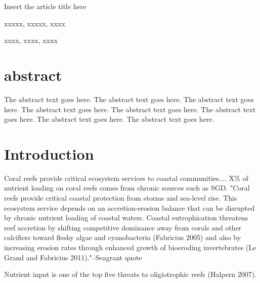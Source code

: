 \documentclass{article}%
\begin{document}
Insert the article title here




xxxxx, xxxxx, xxxx

xxxx, xxxx, xxxx


\linenumbers %
\section{abstract}
The abstract text goes here. The abstract text goes here. The abstract text goes here. The abstract text goes here.
The abstract text goes here. The abstract text goes here. The abstract text goes here. The abstract text goes here.




\section{Introduction  }

Coral reefs provide critical ecosystem services to coastal communities.... 
X\% of nutrient loading on coral reefs comes from chronic sources such as SGD.  
"Coral reefs provide critical coastal protection from storms and sea-level rise. This ecosystem service
depends on an accretion-erosion balance that can be disrupted by chronic nutrient loading of coastal waters.
Coastal eutrophication threatens reef accretion by shifting competitive dominance away from corals and other
calcifiers toward fleshy algae and cyanobacteria (Fabricius 2005) and also by increasing erosion rates through
enhanced growth of bioeroding invertebrates (Le Grand and Fabricius 2011)."--Seagrant quote

Nutrient input is one of the top five threats to oligiotrophic reefs (Halpern 2007).
\end{document}
